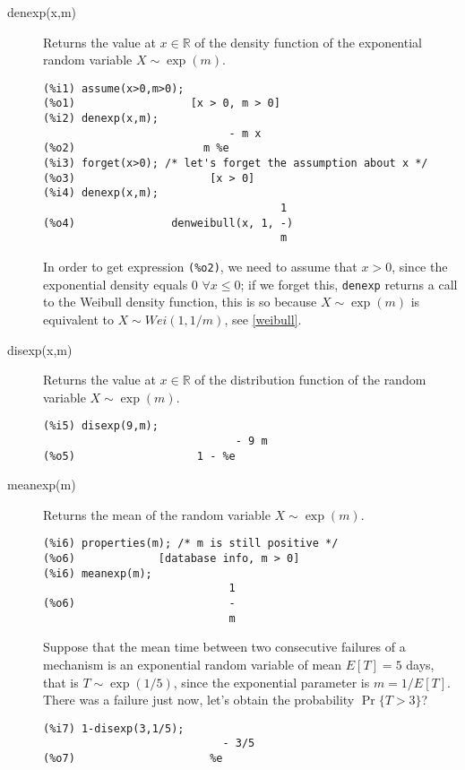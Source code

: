 \documentclass[12pt,a4paper]{article}
\newcommand{\R}{\mathbb{R}}
\begin{document}
\begin{description}

\item[denexp(x,m)] Returns the value at $x \in \R$ of the density function of the exponential random variable $X \sim \exp(m)$.

\begin{verbatim}
(%i1) assume(x>0,m>0);
(%o1)                  [x > 0, m > 0]
(%i2) denexp(x,m);
                             - m x
(%o2)                    m %e
(%i3) forget(x>0); /* let's forget the assumption about x */
(%o3)                     [x > 0]
(%i4) denexp(x,m);
                                     1
(%o4)               denweibull(x, 1, -)
                                     m
\end{verbatim}
In order to get expression \verb|(%o2)|, we need to assume that $x>0$, since the exponential density equals 0 $\forall x \leq 0$; if we forget this, \verb|denexp| returns a call to the Weibull density function, this is so because $X \sim \exp(m)$ is equivalent to $X \sim Wei(1,1/m)$, see \ref{weibull}. 

\item[disexp(x,m)] Returns the value at $x \in \R$ of the distribution function of the random variable $X \sim \exp(m)$.

\begin{verbatim}
(%i5) disexp(9,m);
                              - 9 m
(%o5)                   1 - %e
\end{verbatim}

\item[meanexp(m)] Returns the mean of the random variable  $X \sim \exp(m)$.

\begin{verbatim}
(%i6) properties(m); /* m is still positive */
(%o6)             [database info, m > 0]
(%i6) meanexp(m);
                             1
(%o6)                        -
                             m
\end{verbatim}

Suppose that the mean time between two consecutive failures of a mechanism is an exponential random variable of mean $E[T]=5$ days, that is $T \sim \exp(1/5)$, since the exponential parameter is $m=1/E[T]$. There was a failure just now, let's obtain the probability $\Pr\{T > 3\}$?
\begin{verbatim}
(%i7) 1-disexp(3,1/5);
                            - 3/5
(%o7)                     %e
\end{verbatim}


\end{description}
\end{document}
